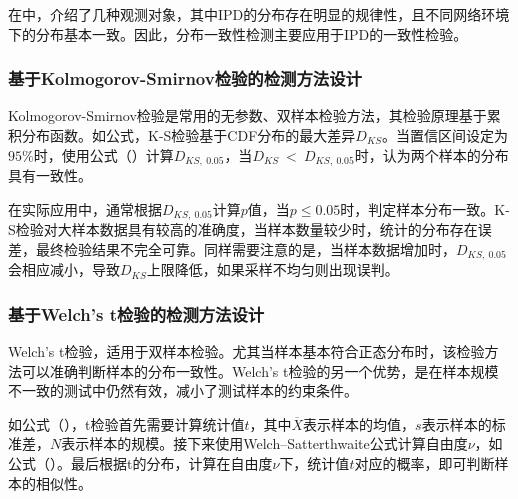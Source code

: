 在中，介绍了几种观测对象，其中IPD的分布存在明显的规律性，且不同网络环境下的分布基本一致。因此，分布一致性检测主要应用于IPD的一致性检验。

\subsubsection{基于Kolmogorov-Smirnov检验的检测方法设计}
\label{chap:analyze:statistical:test:ks}

Kolmogorov-Smirnov检验是常用的无参数、双样本检验方法，其检验原理基于累积分布函数。如公式，K-S检验基于CDF分布的最大差异$D_{KS}$。当置信区间设定为$95\%$时，使用公式（）计算$D_{KS,\ 0.05}$，当$D_{KS}\ <\ D_{KS,\ 0.05}$时，认为两个样本的分布具有一致性。

在实际应用中，通常根据$D_{KS,\ 0.05}$计算$p$值，当$p\leq 0.05$时，判定样本分布一致。K-S检验对大样本数据具有较高的准确度，当样本数量较少时，统计的分布存在误差，最终检验结果不完全可靠。同样需要注意的是，当样本数据增加时，$D_{KS,\ 0.05}$会相应减小，导致$D_{KS}$上限降低，如果采样不均匀则出现误判。

\subsubsection{基于Welch's t检验的检测方法设计}
\label{chap:analyze:statistical:test:t}

Welch's t检验，适用于双样本检验。尤其当样本基本符合正态分布时，该检验方法可以准确判断样本的分布一致性。Welch's t检验的另一个优势，是在样本规模不一致的测试中仍然有效，减小了测试样本的约束条件。


如公式（），t检验首先需要计算统计值$t$，其中$\overline{X}$表示样本的均值，$s$表示样本的标准差，$N$表示样本的规模。接下来使用Welch–Satterthwaite公式计算自由度$\nu$，如公式（）。最后根据t的分布，计算在自由度$\nu$下，统计值$t$对应的概率，即可判断样本的相似性。

